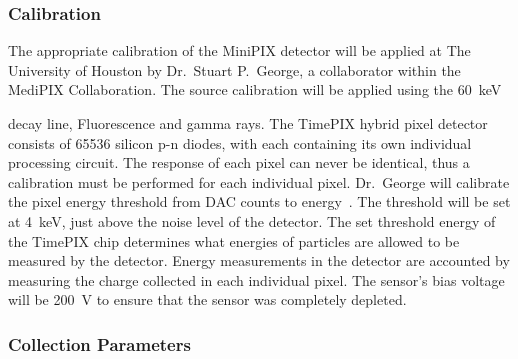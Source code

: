 
\subsubsection{Calibration}   
The appropriate calibration of the MiniPIX detector will be applied at The University of Houston by Dr.~Stuart P.~George, a collaborator within the MediPIX Collaboration. The source calibration will be applied using the \SI{60}{\keV} { decay line,  Fluorescence and  gamma rays. The TimePIX hybrid pixel detector consists of \num{65536} silicon p-n diodes, with each containing its own individual processing circuit. The response of each pixel can never be identical, thus a calibration must be performed for each individual pixel. Dr.~George will calibrate the pixel energy threshold from DAC counts to energy~\cite{stuartthesis}. The threshold will be set at \SI{4}{\keV}, just above the noise level of the detector. The set threshold energy of the TimePIX chip determines what energies of particles are allowed to be measured by the detector. Energy measurements in the detector are accounted by measuring the charge collected in each individual pixel. The sensor's bias voltage will be \SI{200}{\volt} to ensure that the sensor was completely depleted. 
  
\subsubsection{Collection Parameters}

}
